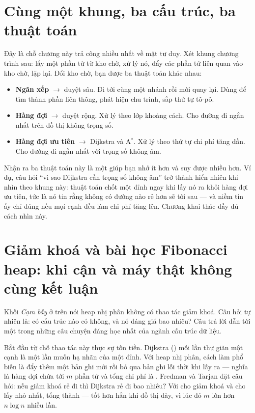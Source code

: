 \documentclass[../../algorithm.tex]{subfiles}
\begin{document}
\section{Cùng một khung, ba cấu trúc, ba thuật toán}

Đây là chỗ chương này trả công nhiều nhất về mặt tư duy. Xét khung chương trình sau: lấy một phần tử từ kho chờ, xử lý nó, đẩy các phần tử liên quan vào kho chờ, lặp lại. Đổi kho chờ, bạn được ba thuật toán khác nhau:

\begin{itemize}
\item \textbf{Ngăn xếp} \(\rightarrow\) duyệt sâu. Đi tới cùng một nhánh rồi mới quay lại. Dùng để tìm thành phần liên thông, phát hiện chu trình, sắp thứ tự tô-pô.
\item \textbf{Hàng đợi} \(\rightarrow\) duyệt rộng. Xử lý theo lớp khoảng cách. Cho đường đi ngắn nhất trên đồ thị không trọng số.
\item \textbf{Hàng đợi ưu tiên} \(\rightarrow\) Dijkstra và A\(^\ast\). Xử lý theo thứ tự chi phí tăng dần. Cho đường đi ngắn nhất với trọng số không âm.
\end{itemize}

Nhận ra ba thuật toán này là một giúp bạn nhớ ít hơn và suy được nhiều hơn. Ví dụ, câu hỏi ``vì sao Dijkstra cần trọng số không âm'' trở thành hiển nhiên khi nhìn theo khung này: thuật toán chốt một đỉnh ngay khi lấy nó ra khỏi hàng đợi ưu tiên, tức là nó tin rằng không có đường nào rẻ hơn sẽ tới sau --- và niềm tin ấy chỉ đúng nếu mọi cạnh đều làm chi phí tăng lên. Chương  khai thác đầy đủ cách nhìn này.

\section{Giảm khoá và bài học Fibonacci heap: khi cận và máy thật không cùng kết luận}

Khối \emph{Cạm bẫy} ở trên nói heap nhị phân không có thao tác giảm khoá. Câu hỏi tự nhiên là: có cấu trúc nào có không, và nó đáng giá bao nhiêu? Câu trả lời dẫn tới một trong những câu chuyện đáng học nhất của ngành cấu trúc dữ liệu.

Bắt đầu từ chỗ thao tác này thực sự tốn tiền. Dijkstra () mỗi lần thư giãn một cạnh là một lần muốn hạ nhãn của một đỉnh. Với heap nhị phân, cách làm phổ biến là đẩy thêm một bản ghi mới rồi bỏ qua bản ghi lỗi thời khi lấy ra --- nghĩa là hàng đợi chứa tới \(m\) phần tử và tổng chi phí là . Fredman và Tarjan\cite{fredman1987} đặt câu hỏi: nếu giảm khoá rẻ đi thì Dijkstra rẻ đi bao nhiêu? Với  cho giảm khoá và  cho lấy nhỏ nhất, tổng thành  --- tốt hơn hẳn khi đồ thị dày, vì lúc đó \(m\) lớn hơn \(n\log n\) nhiều lần.
\end{document}
